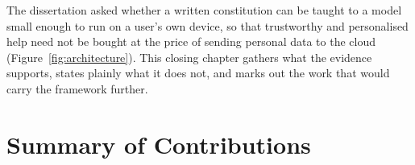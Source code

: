 %
%

The dissertation asked whether a written constitution can be taught to a model small enough to run on a user's own device, so that trustworthy and personalised help need not be bought at the price of sending personal data to the cloud (Figure~\ref{fig:architecture}). This closing chapter gathers what the evidence supports, states plainly what it does not, and marks out the work that would carry the framework further.

\section{Summary of Contributions}
\label{sec:conclusion-contributions}

